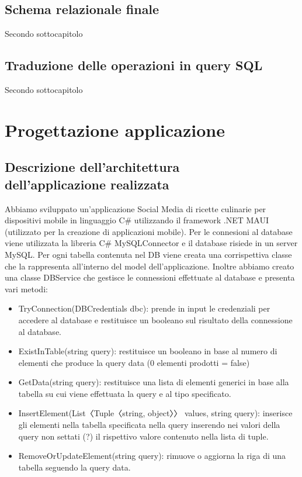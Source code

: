 ﻿\documentclass[a4paper,12pt]{report}
\begin{document}
\section{Schema relazionale finale}
Secondo sottocapitolo
\section{Traduzione delle operazioni in query SQL}
Secondo sottocapitolo


\chapter{Progettazione applicazione}
\section{Descrizione dell'architettura\\ dell'applicazione realizzata}
Abbiamo sviluppato un'applicazione Social Media di ricette culinarie per dispositivi mobile in linguaggio C\# utilizzando il framework .NET MAUI (utilizzato per la creazione di applicazioni mobile).
Per le connesioni al database viene utilizzata la libreria C\# MySQLConnector e il database risiede in un server MySQL.
Per ogni tabella contenuta nel DB viene creata una corrispettiva classe che la rappresenta all'interno del
model dell'applicazione. Inoltre abbiamo creato una classe DBService che gestisce le connessioni effettuate al database e presenta vari metodi:
\begin{itemize}
    \item TryConnection(DBCredentials dbc): prende in input le credenziali per accedere al database e restituisce un booleano sul risultato della connessione al database.
    \item ExistInTable(string query): restituisce un booleano in base al numero di elementi che produce la query data (0 elementi prodotti = false)
    \item GetData(string query): restituisce una lista di elementi generici in base alla tabella su cui viene effettuata la query e al tipo specificato.
    \item InsertElement(List〈Tuple〈string, object〉〉 values, string query): inserisce gli elementi nella tabella specificata nella query inserendo nei valori della query non settati (?) il rispettivo valore contenuto nella lista di tuple.
    \item RemoveOrUpdateElement(string query): rimuove o aggiorna la riga di una tabella seguendo la query data.
\end{itemize}
\end{document}

